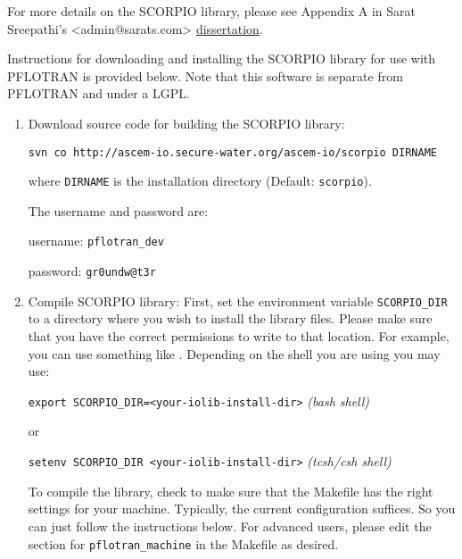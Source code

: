 For more details on the SCORPIO library, please see Appendix A in Sarat Sreepathi's \linebreak <admin@sarats.com> \href{http://www.lib.ncsu.edu/resolver/1840.16/8317}{dissertation}.

Instructions for downloading and installing the SCORPIO library for use with PFLOTRAN is provided below. Note that this software is separate from PFLOTRAN and under a LGPL.
\begin{enumerate}

\item Download source code for building the SCORPIO library:

{\small\tt svn co http://ascem-io.secure-water.org/ascem-io/scorpio DIRNAME}

where {\footnotesize\tt DIRNAME} is the installation directory (Default: {\footnotesize\tt scorpio}). 

The username and password are:

username: {\footnotesize\tt pflotran\_dev}

password: {\footnotesize\tt gr0undw@t3r}

\item Compile SCORPIO library:
First, set the environment variable {\footnotesize\tt SCORPIO\_DIR} to a directory where you wish to install the library files. 
Please make sure that you have the correct permissions to write to that location. For example, you can use something like .
Depending on the shell you are using you may use:

\footnotesize {\tt export SCORPIO\_DIR=<your-iolib-install-dir>} \hfill {\it (bash shell)}
\normalsize

or

\footnotesize
{\tt setenv SCORPIO\_DIR <your-iolib-install-dir>} \hfill {\it (tcsh/csh shell)}

\normalsize

To compile the library, check to make sure that the Makefile has the right settings for your machine.
Typically, the current configuration suffices. So you can just follow the instructions below.
For advanced users, please edit the section for {\footnotesize\tt pflotran\_machine} in the Makefile as desired.


\end{enumerate}
